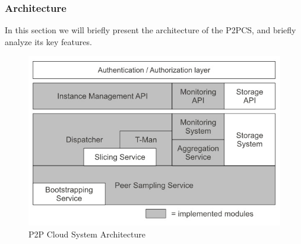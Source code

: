 \documentclass[11pt]{amsart}
\begin{document}
	\subsubsection{Architecture}
	In this section we will briefly present the architecture of the P2PCS, and briefly analyze its 
	key features.
	 
	\begin{center}
		\begin{figure}[h]
			\includegraphics[width=125mm]{p2pcs_arch.jpg}
			\caption{P2P Cloud System Architecture\label{p2pcs_arch}}
		\end{figure}
	\end{center}
	
\end{document}
